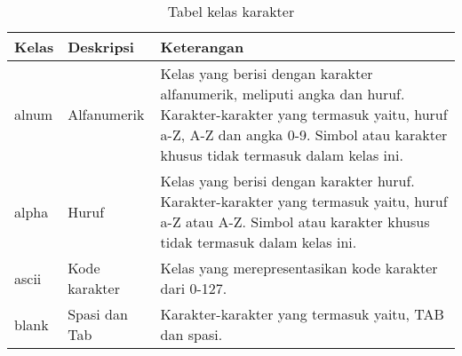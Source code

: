 \begin{table}[H]
	\renewcommand{\arraystretch}{1.5}
	\caption {Tabel kelas karakter} \label{tab:character classes1}
	\begin{center}
		\begin{tabular}{|p{2 cm}|>{\raggedright} p{5 cm}| p{7.5 cm}|}
		\hline
		Kelas & Deskripsi & Keterangan \\ 
		\hline 
		alnum & Alfanumerik & Kelas yang berisi dengan karakter alfanumerik, meliputi angka dan huruf. Karakter-karakter yang termasuk yaitu, huruf a-Z, A-Z dan angka 0-9. Simbol atau karakter khusus tidak termasuk dalam kelas ini. \newline \\ 
		\hline 
		alpha & Huruf & Kelas yang berisi dengan karakter huruf. Karakter-karakter yang termasuk yaitu, huruf a-Z atau A-Z.	Simbol atau karakter khusus tidak termasuk dalam kelas ini. \newline \\ 
		\hline 
		ascii & Kode karakter & Kelas yang merepresentasikan kode karakter dari 0-127. \newline \\ 
		\hline 
		blank & Spasi dan Tab & Karakter-karakter yang termasuk yaitu, TAB dan spasi. \newline \\ 
		\hline
		\end{tabular} 
	\end{center}
\end{table}

